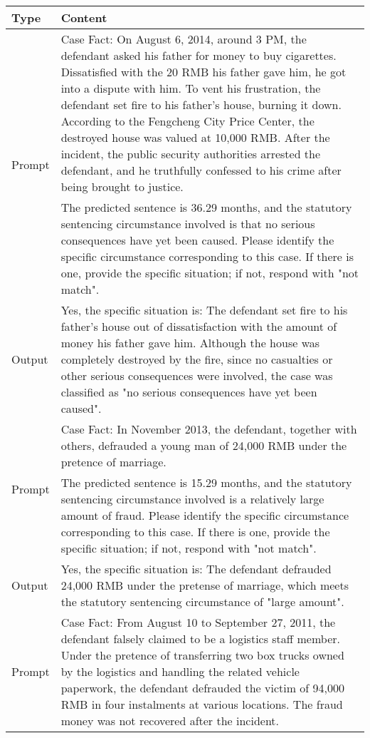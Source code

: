 \begin{table*}[]
    \centering
    \begin{tabular}{p{}|p{}}
    \toprule
    Type &  Content\\
    \midrule
    \multirow{2}{*}{Prompt} &  Case Fact: On August 6, 2014, around 3 PM, the defendant asked his father for money to buy cigarettes. Dissatisfied with the 20 RMB his father gave him, he got into a dispute with him. To vent his frustration, the defendant set fire to his father's house, burning it down. According to the Fengcheng City Price Center, the destroyed house was valued at 10,000 RMB. After the incident, the public security authorities arrested the defendant, and he truthfully confessed to his crime after being brought to justice.\\
    & The predicted sentence is 36.29 months, and the statutory sentencing circumstance involved is that no serious consequences have yet been caused. Please identify the specific circumstance corresponding to this case. If there is one, provide the specific situation; if not, respond with "not match".\\
    Output &  Yes, the specific situation is: The defendant set fire to his father's house out of dissatisfaction with the amount of money his father gave him. Although the house was completely destroyed by the fire, since no casualties or other serious consequences were involved, the case was classified as "no serious consequences have yet been caused".\\
    \midrule
    \multirow{2}{*}{Prompt}  &  Case Fact: In November 2013, the defendant, together with others, defrauded a young man of 24,000 RMB under the pretence of marriage.\\
    & The predicted sentence is 15.29 months, and the statutory sentencing circumstance involved is a relatively large amount of fraud. Please identify the specific circumstance corresponding to this case. If there is one, provide the specific situation; if not, respond with "not match".\\
    Output & Yes, the specific situation is: The defendant defrauded 24,000 RMB under the pretense of marriage, which meets the statutory sentencing circumstance of "large amount". \\
    \midrule
    \multirow{2}{*}{Prompt}  & Case Fact: From August 10 to September 27, 2011, the defendant falsely claimed to be a logistics staff member. Under the pretence of transferring two box trucks owned by the logistics and handling the related vehicle paperwork, the defendant defrauded the victim of 94,000 RMB in four instalments at various locations. The fraud money was not recovered after the incident. \\

\end{tabular}
\end{table*}
